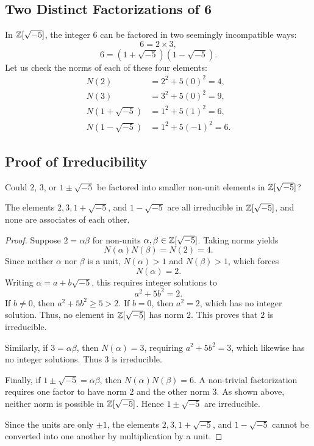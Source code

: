 \documentclass[a4paper]{article}
\begin{document}
\subsection{Two Distinct Factorizations of 6}
In $\mathbb{Z}[\sqrt{-5}]$, the integer $6$ can be factored in two seemingly incompatible ways:
\begin{equation}
 6 = 2 \times 3,
 \label{eq:fact1}
\end{equation}
\begin{equation}
 6 = (1 + \sqrt{-5})(1 - \sqrt{-5}).
 \label{eq:fact2}
\end{equation}
Let us check the norms of each of these four elements:
\begin{align}
 N(2) &= 2^2 + 5(0)^2 = 4, \\
 N(3) &= 3^2 + 5(0)^2 = 9, \\
 N(1 + \sqrt{-5}) &= 1^2 + 5(1)^2 = 6, \\
 N(1 - \sqrt{-5}) &= 1^2 + 5(-1)^2 = 6.
\end{align}

\subsection{Proof of Irreducibility}
Could $2$, $3$, or $1 \pm \sqrt{-5}$ be factored into smaller non-unit elements in $\mathbb{Z}[\sqrt{-5}]$?
\begin{proposition}
The elements $2, 3, 1+\sqrt{-5}$, and $1-\sqrt{-5}$ are all irreducible in $\mathbb{Z}[\sqrt{-5}]$, and none are associates of each other.
\end{proposition}
\begin{proof}
Suppose $2 = \alpha \beta$ for non-units $\alpha, \beta \in \mathbb{Z}[\sqrt{-5}]$. Taking norms yields
\begin{equation}
 N(\alpha) N(\beta) = N(2) = 4.
\end{equation}
Since neither $\alpha$ nor $\beta$ is a unit, $N(\alpha) > 1$ and $N(\beta) > 1$, which forces
\begin{equation}
 N(\alpha) = 2.
\end{equation}
Writing $\alpha = a + b\sqrt{-5}$, this requires integer solutions to
\begin{equation}
 a^2 + 5b^2 = 2.
\end{equation}
If $b \ne 0$, then $a^2 + 5b^2 \ge 5 > 2$. If $b = 0$, then $a^2 = 2$, which has no integer solution. Thus, no element in $\mathbb{Z}[\sqrt{-5}]$ has norm $2$. This proves that $2$ is irreducible.

Similarly, if $3 = \alpha \beta$, then $N(\alpha) = 3$, requiring $a^2 + 5b^2 = 3$, which likewise has no integer solutions. Thus $3$ is irreducible.

Finally, if $1 \pm \sqrt{-5} = \alpha \beta$, then $N(\alpha) N(\beta) = 6$. A non-trivial factorization requires one factor to have norm $2$ and the other norm $3$. As shown above, neither norm is possible in $\mathbb{Z}[\sqrt{-5}]$. Hence $1 \pm \sqrt{-5}$ are irreducible.

Since the units are only $\pm 1$, the elements $2, 3, 1+\sqrt{-5}$, and $1-\sqrt{-5}$ cannot be converted into one another by multiplication by a unit.
\end{proof}
\end{document}
